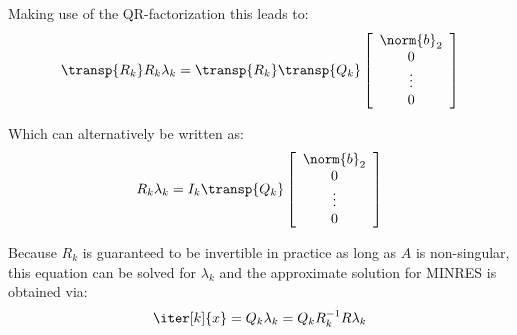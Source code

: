 \noindent Making use of the QR-factorization this leads to:
\begin{equation}
    \transp{R_k}R_k\lambda_k=\transp{R_k}\transp{Q_{k}}\left[
        \begin{array}{c}
      \norm{b}_2 \\
       0 \\
      \vdots \\
      0 \\
    \end{array}\right]
\end{equation}

\noindent Which can alternatively be written as:
\begin{equation}
    R_k\lambda_k=I_k\transp{Q_{k}}\left[
        \begin{array}{c}
      \norm{b}_2 \\
       0 \\
      \vdots \\
      0 \\
    \end{array}\right]
\end{equation}

\noindent Because $R_k$ is guaranteed to be invertible in practice as long as $A$ is non-singular, this equation can be solved for $\lambda_k$ and the approximate solution for MINRES is obtained via:
\begin{equation}
    \iter[k]{x} = Q_k\lambda_k=Q_kR_k^{-1}R\lambda_k
\end{equation}